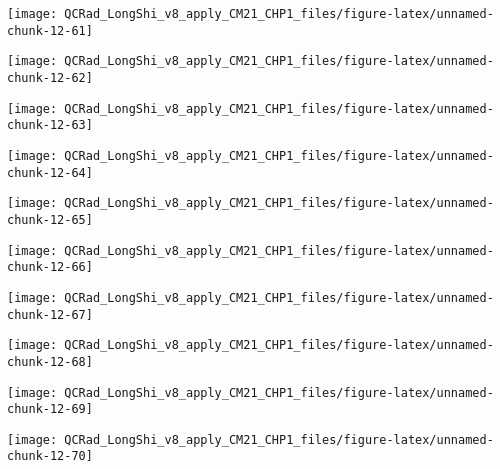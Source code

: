 \documentclass[
  10pt,
  a4paper,oneside]{article}
\begin{document}
\begin{center}\texttt{[image: QCRad\_LongShi\_v8\_apply\_CM21\_CHP1\_files/figure-latex/unnamed-chunk-12-61]} \end{center}

\begin{center}\texttt{[image: QCRad\_LongShi\_v8\_apply\_CM21\_CHP1\_files/figure-latex/unnamed-chunk-12-62]} \end{center}

\begin{center}\texttt{[image: QCRad\_LongShi\_v8\_apply\_CM21\_CHP1\_files/figure-latex/unnamed-chunk-12-63]} \end{center}

\begin{center}\texttt{[image: QCRad\_LongShi\_v8\_apply\_CM21\_CHP1\_files/figure-latex/unnamed-chunk-12-64]} \end{center}

\begin{center}\texttt{[image: QCRad\_LongShi\_v8\_apply\_CM21\_CHP1\_files/figure-latex/unnamed-chunk-12-65]} \end{center}

\begin{center}\texttt{[image: QCRad\_LongShi\_v8\_apply\_CM21\_CHP1\_files/figure-latex/unnamed-chunk-12-66]} \end{center}

\begin{center}\texttt{[image: QCRad\_LongShi\_v8\_apply\_CM21\_CHP1\_files/figure-latex/unnamed-chunk-12-67]} \end{center}

\begin{center}\texttt{[image: QCRad\_LongShi\_v8\_apply\_CM21\_CHP1\_files/figure-latex/unnamed-chunk-12-68]} \end{center}

\begin{center}\texttt{[image: QCRad\_LongShi\_v8\_apply\_CM21\_CHP1\_files/figure-latex/unnamed-chunk-12-69]} \end{center}

\begin{center}\texttt{[image: QCRad\_LongShi\_v8\_apply\_CM21\_CHP1\_files/figure-latex/unnamed-chunk-12-70]} \end{center}
\end{document}

